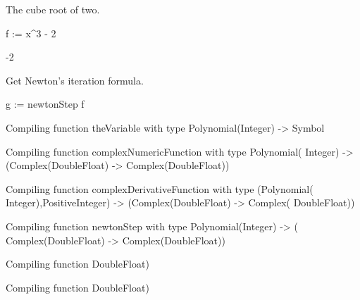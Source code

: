 \begin{xtc}
\begin{xtccomment}
The cube root of two.
\end{xtccomment}
\begin{spadsrc}
f := x^3 - 2
\end{spadsrc}
\begin{TeXOutput}
\begin{fricasmath}{19}
-{2}%
\end{fricasmath}
\end{TeXOutput}
\end{xtc}
\begin{xtc}
\begin{xtccomment}
Get Newton's iteration formula.
\end{xtccomment}
\begin{spadsrc}
g := newtonStep f
\end{spadsrc}
\begin{MessageOutput}
   Compiling function theVariable with type Polynomial(Integer) -> 
      Symbol 
\end{MessageOutput}
\begin{MessageOutput}
   Compiling function complexNumericFunction with type Polynomial(
      Integer) -> (Complex(DoubleFloat) -> Complex(DoubleFloat)) 
\end{MessageOutput}
\begin{MessageOutput}
   Compiling function complexDerivativeFunction with type (Polynomial(
      Integer),PositiveInteger) -> (Complex(DoubleFloat) -> Complex(
      DoubleFloat)) 
\end{MessageOutput}
\begin{MessageOutput}
   Compiling function newtonStep with type Polynomial(Integer) -> (
      Complex(DoubleFloat) -> Complex(DoubleFloat)) 
\end{MessageOutput}
\begin{MessageOutput}
   Compiling function %
      DoubleFloat) 
\end{MessageOutput}
\begin{MessageOutput}
   Compiling function %
      DoubleFloat) 
\end{MessageOutput}
\begin{TeXOutput}
\begin{fricasmath}{20}
%
\end{fricasmath}
\end{TeXOutput}
\end{xtc}
